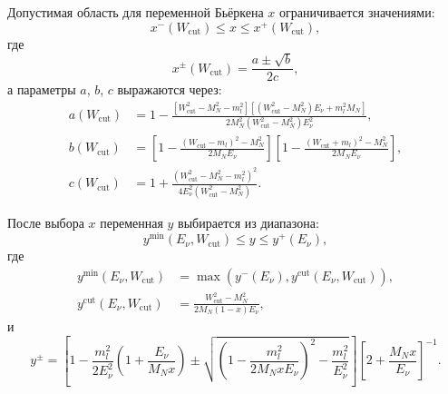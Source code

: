 Допустимая область для переменной Бьёркена $x$ ограничивается значениями:
\begin{equation}
    x^{-}(W_{\text{cut}}) \le x \le x^{+}(W_{\text{cut}}),
\end{equation}
где
\begin{equation}
    x^{\pm}(W_{\text{cut}}) = \frac{a \pm \sqrt{b}}{2c},
\end{equation}
а параметры $a$, $b$, $c$ выражаются через:
\begin{equation}
    \begin{aligned}
        a(W_{\text{cut}}) &= 1 - \frac{[W_{\text{cut}}^2 - M_N^2 - m_l^2][(W_{\text{cut}}^2 - M_N^2)E_\nu + m_l^2 M_N]}{2M_N^2(W_{\text{cut}}^2 - M_N^2)E_\nu^2}, \\
        b(W_{\text{cut}}) &= \left[ 1 - \frac{(W_{\text{cut}} - m_l)^2 - M_N^2}{2M_N E_\nu} \right] \left[ 1 - \frac{(W_{\text{cut}} + m_l)^2 - M_N^2}{2M_N E_\nu} \right], \\
        c(W_{\text{cut}}) &= 1 + \frac{(W_{\text{cut}}^2 - M_N^2 - m_l^2)^2}{4E_\nu^2(W_{\text{cut}}^2 - M_N^2)}.
    \end{aligned}
\end{equation}

После выбора $x$ переменная $y$ выбирается из диапазона:
\begin{equation}
    y^{\text{min}}(E_\nu, W_{\text{cut}}) \le y \le y^+(E_\nu),
\end{equation}
где
\begin{equation}
    \begin{aligned}
        y^{\text{min}}(E_\nu, W_{\text{cut}}) &= \max\left( y^-(E_\nu), y^{\text{cut}}(E_\nu, W_{\text{cut}}) \right), \\
        y^{\text{cut}}(E_\nu, W_{\text{cut}}) &= \frac{W_{\text{cut}}^2 - M_N^2}{2M_N(1 - x)E_\nu},
    \end{aligned}
\end{equation}
и
\begin{equation}
    y^{\pm} = \left[ 1 - \frac{m_l^2}{2E_\nu^2}\left(1 + \frac{E_\nu}{M_N x} \right) \pm \sqrt{ \left(1 - \frac{m_l^2}{2M_N x E_\nu} \right)^2 - \frac{m_l^2}{E_\nu^2} } \right] \left[ 2 + \frac{M_N x}{E_\nu} \right]^{-1}.
\end{equation}
